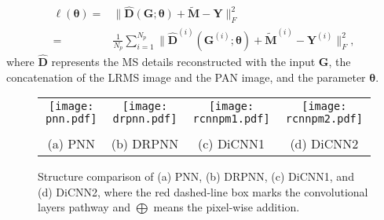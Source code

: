 \documentclass[journal]{IEEEtran}
\begin{document}
\begin{equation}
\label{eq:DICNN1}
\begin{split}
\ell(\pmb{\theta})
=& \|\widehat{\mathbf{D}}(\mathbf{G};\pmb{\theta}) + \widetilde {\mathbf{M}} - {\mathbf{Y}}\|^2_F\\
=&\frac{1}{N_p} \sum_{i=1}^{N_p} \|\widehat{\mathbf{D}}^{(i)}(\mathbf{G}^{(i)};\pmb{\theta}) + \widetilde {\mathbf{M}}^{(i)} - {\mathbf{Y}^{(i)}}\|^2_F,
\end{split}
\end{equation}
where $\widehat{\mathbf{D}}$ represents the MS details reconstructed with the input ${\mathbf{G}}$, the concatenation of the LRMS image and the PAN image, and the parameter $\pmb{\theta}$.

\begin{figure*}[ht]\scriptsize
\centering
  \begin{tabular}{cccc}
   \texttt{[image: pnn.pdf]} &
   \texttt{[image: drpnn.pdf]} &
  \texttt{[image: rcnnpm1.pdf]}  &
  \texttt{[image: rcnnpm2.pdf]}\\
\\
 (a) PNN	&  (b) DRPNN & (c) DiCNN1 & (d) DiCNN2\\
  \end{tabular}
\caption{Structure comparison of (a) PNN, (b) DRPNN, (c) DiCNN1, and (d) DiCNN2, where the red dashed-line box marks the convolutional layers pathway and $\bigoplus$ means the pixel-wise addition.}
\label{fig:StructComp}
\end{figure*}
\end{document}
